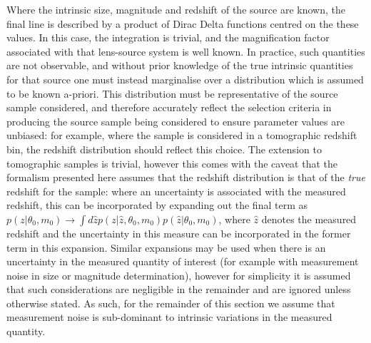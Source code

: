 \documentclass[useAMS,usenatbib,times,letter,amssymb]{mn2e}
\begin{document}
Where the intrinsic size, magnitude and redshift of the source are known, the final line is described by a product of Dirac Delta functions centred on the these values. In this case, the integration is trivial, and the magnification factor associated with that lens-source system is well known. In practice, such quantities are not observable, and without prior knowledge of the true intrinsic quantities for that source one must instead marginalise over a distribution which is assumed to be known a-priori. This distribution must be representative of the source sample considered, and therefore accurately reflect the selection criteria in producing the source sample being considered to ensure parameter values are unbiased: for example, where the sample is considered in a tomographic redshift bin, the redshift distribution should reflect this choice. The extension to tomographic samples is trivial, however this comes with the caveat that the formalism presented here assumes that the redshift distribution is that of the {\it true} redshift for the sample: where an uncertainty is associated with the measured redshift, this can be incorporated by expanding out the final term as $p(z|\theta_0,m_0) \to \int d\hat{z} p(z|\hat{z}, \theta_0, m_0)p(\hat{z}|\theta_0, m_0)$, where $\hat{z}$ denotes the measured redshift and the uncertainty in this measure can be incorporated in the former term in this expansion. Similar expansions may be used when there is an uncertainty in the measured quantity of interest (for example with measurement noise in size or magnitude determination), however for simplicity it is assumed that such considerations are negligible in the remainder and are ignored unless otherwise stated. As such, for the remainder of this section we assume that measurement noise is sub-dominant to intrinsic variations in the measured quantity.
\end{document}
